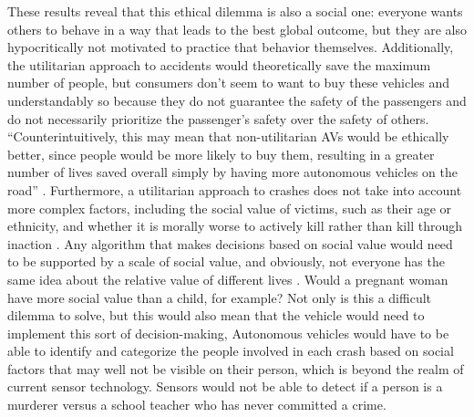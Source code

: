 \documentclass[10pt,twocolumn]{article}
\begin{document}
These results reveal that this ethical dilemma is also a social one: everyone wants others to behave in a way that leads to the best global outcome, but they are also hypocritically not motivated to practice that behavior themselves. Additionally, the utilitarian approach to accidents would theoretically save the maximum number of people, but consumers don’t seem to want to buy these vehicles and understandably so because they do not guarantee the safety of the passengers and do not necessarily prioritize the passenger’s safety over the safety of others. “Counterintuitively, this may mean that non-utilitarian AVs would be ethically better, since people would be more likely to buy them, resulting in a greater number of lives saved overall simply by having more autonomous vehicles on the road” \cite{AutonomousAccidents}. Furthermore, a utilitarian approach to crashes does not take into account more complex factors, including the social value of victims, such as their age or ethnicity, and whether it is morally worse to actively kill rather than kill through inaction \cite{AutonomousAccidents}. Any algorithm that makes decisions based on social value would need to be supported by a scale of social value, and obviously, not everyone has the same idea about the relative value of different lives  \cite{AutonomousAccidents}. Would a pregnant woman have more social value than a child, for example? Not only is this a difficult dilemma to solve, but this would also mean that the vehicle would need to implement this sort of decision-making, Autonomous vehicles would have to be able to identify and categorize the people involved in each crash based on social factors that may well not be visible on their person, which is beyond the realm of current sensor technology. Sensors would not be able to detect if a person is a murderer versus a school teacher who has never committed a crime.
\end{document}

